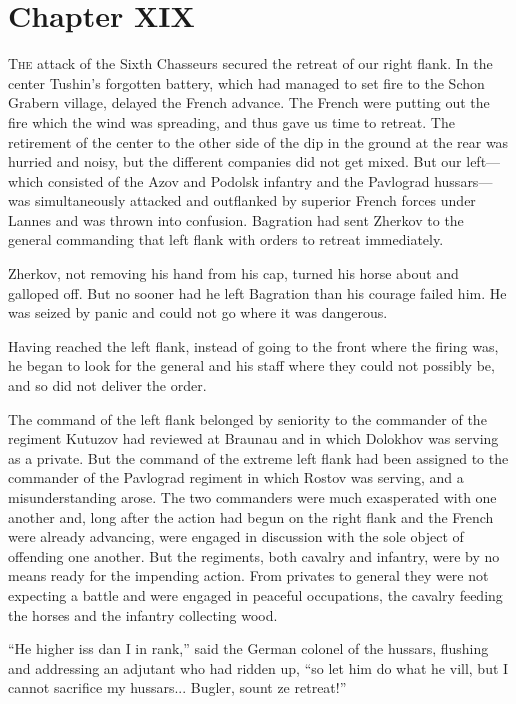 \chapter*{Chapter XIX}
\ifaudio     {} \fi

\lettrine[lines=2, loversize=0.3, lraise=0]{\initfamily T}{he}
attack of the Sixth Chasseurs secured the retreat of our
right flank. In the center Tushin's forgotten battery, which had
managed to set fire to the Schon Grabern village, delayed the
French advance. The French were putting out the fire which the
wind was spreading, and thus gave us time to retreat. The
retirement of the center to the other side of the dip in the
ground at the rear was hurried and noisy, but the different
companies did not get mixed. But our left---which consisted of
the Azov and Podolsk infantry and the Pavlograd hussars---was
simultaneously attacked and outflanked by superior French forces
under Lannes and was thrown into confusion. Bagration had sent
Zherkov to the general commanding that left flank with orders to
retreat immediately.

Zherkov, not removing his hand from his cap, turned his horse
about and galloped off. But no sooner had he left Bagration than
his courage failed him. He was seized by panic and could not go
where it was dangerous.

Having reached the left flank, instead of going to the front
where the firing was, he began to look for the general and his
staff where they could not possibly be, and so did not deliver
the order.

The command of the left flank belonged by seniority to the
commander of the regiment Kutuzov had reviewed at Braunau and in
which Dolokhov was serving as a private. But the command of the
extreme left flank had been assigned to the commander of the
Pavlograd regiment in which Rostov was serving, and a
misunderstanding arose. The two commanders were much exasperated
with one another and, long after the action had begun on the
right flank and the French were already advancing, were engaged
in discussion with the sole object of offending one another. But
the regiments, both cavalry and infantry, were by no means ready
for the impending action. From privates to general they were not
expecting a battle and were engaged in peaceful occupations, the
cavalry feeding the horses and the infantry collecting wood.

``He higher iss dan I in rank,'' said the German colonel of the
hussars, flushing and addressing an adjutant who had ridden up,
``so let him do what he vill, but I cannot sacrifice my
hussars... Bugler, sount ze retreat!''

